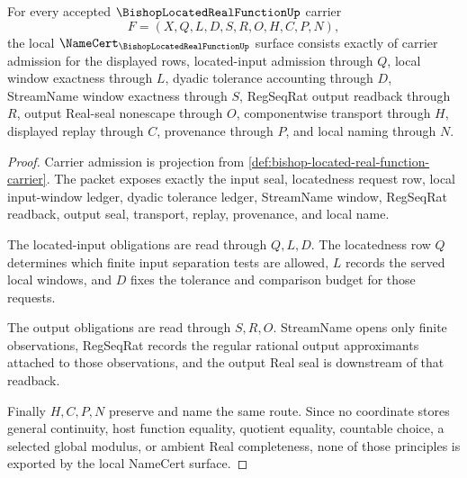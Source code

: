 \begin{theorem}
\label{thm:bishop-located-real-function-obligations}
For every accepted $\BishopLocatedRealFunctionUp$ carrier
$$
F=(X,Q,L,D,S,R,O,H,C,P,N),
$$
the local $\NameCert_{\BishopLocatedRealFunctionUp}$ surface consists exactly of carrier admission for the displayed rows, located-input admission through $Q$, local window exactness through $L$, dyadic tolerance accounting through $D$, StreamName window exactness through $S$, RegSeqRat output readback through $R$, output Real-seal nonescape through $O$, componentwise transport through $H$, displayed replay through $C$, provenance through $P$, and local naming through $N$.
\end{theorem}
\begin{proof}
Carrier admission is projection from \autoref{def:bishop-located-real-function-carrier}. The packet exposes exactly the input seal, locatedness request row, local input-window ledger, dyadic tolerance ledger, StreamName window, RegSeqRat readback, output seal, transport, replay, provenance, and local name.

The located-input obligations are read through $Q,L,D$. The locatedness row $Q$ determines which finite input separation tests are allowed, $L$ records the served local windows, and $D$ fixes the tolerance and comparison budget for those requests.

The output obligations are read through $S,R,O$. StreamName opens only finite observations, RegSeqRat records the regular rational output approximants attached to those observations, and the output Real seal is downstream of that readback.

Finally $H,C,P,N$ preserve and name the same route. Since no coordinate stores general continuity, host function equality, quotient equality, countable choice, a selected global modulus, or ambient Real completeness, none of those principles is exported by the local NameCert surface.
\end{proof}

